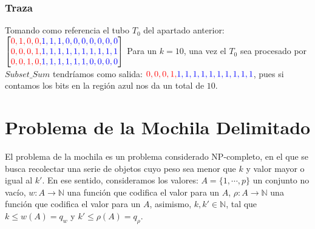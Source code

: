 \documentclass[12pt, letterpaper, twoside]{article}
\begin{document}
    \subsubsection{Traza}
    Tomando como referencia el tubo $T_0$ del apartado anterior: \\
    $
        \begin{bmatrix}
            \textcolor{red}{0, 1, 0, 0,} \textcolor{blue}{1, 1, 1, 0, 0, 0, 0, 0, 0, 0} \\
            \textcolor{red}{0, 0, 0, 1,} \textcolor{blue}{1, 1, 1, 1, 1, 1, 1, 1, 1, 1} \\
            \textcolor{red}{0, 0, 1, 0,} \textcolor{blue}{1, 1, 1, 1, 1, 1, 0, 0, 0, 0}
        \end{bmatrix}
    $
    Para un $k=10$, una vez el $T_0$ sea procesado por $Subset\_Sum$ tendríamos como salida: $\textcolor{red}{0, 0, 0, 1,} \textcolor{blue}{1, 1, 1, 1, 1, 1, 1, 1, 1, 1}$, pues si contamos los bits en la región azul nos da un total de $10$.
    \section{Problema de la Mochila Delimitado}
    El problema de la mochila es un problema considerado NP-completo, en el que se busca recolectar una serie de objetos cuyo peso sea menor que $k$ y valor mayor o igual al $k'$. En ese sentido, consideramos los valores: $A=\{1,\cdots,p\}$ un conjunto no vacío, $w:A\rightarrow\mathbb{N}$ una función que codifica el valor para un $A$, $\rho:A\rightarrow\mathbb{N}$ una función que codifica el valor para un $A$, asimismo, $k,k'\in\mathbb{N}$, tal que $k\leq w(A)=q_w$ y $k'\leq \rho(A)=q_\rho$.
\end{document}
